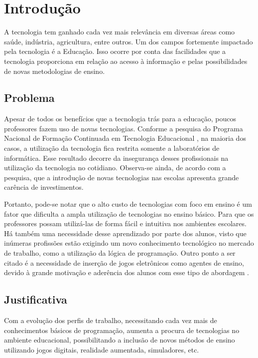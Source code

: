 
\chapter{Introdução}\label{intro}

A tecnologia tem ganhado cada vez mais relevância em diversas áreas como saúde, indústria, agricultura, entre outros. Um dos campos fortemente impactado pela tecnologia é a Educação. Isso ocorre por conta das facilidades que a tecnologia proporciona em relação ao acesso à informação e pelas possibilidades de novas metodologias de ensino. 


\section{Problema}

Apesar de todos os benefícios que a tecnologia trás para a educação, poucos professores fazem uso de novas tecnologias. Conforme a pesquisa do Programa Nacional de Formação Continuada em Tecnologia Educacional \cite{suenia_andre_2012} , na maioria dos casos, a utilização da tecnologia fica restrita somente a laboratórios de informática. Esse resultado decorre da insegurança desses profissionais na utilização da tecnologia no cotidiano. Observa-se ainda, de acordo com a pesquisa, que a introdução de novas tecnologias nas escolas apresenta grande carência de investimentos.

Portanto, pode-se notar que o alto custo de  tecnologias com foco em ensino é um fator que dificulta a ampla utilização de tecnologias no ensino básico. Para que os professores possam utilizá-las de forma fácil e intuitiva nos ambientes escolares. Há também uma necessidade desse aprendizado por parte dos alunos, visto que inúmeras profissões estão exigindo um novo conhecimento tecnológico no mercado de trabalho, como a utilização da lógica de programação. Outro ponto a ser citado é a necessidade de inserção de jogos eletrônicos como agentes de ensino, devido à grande motivação e aderência dos alunos com esse tipo de abordagem \cite{kaue_tatiane_marcos_2017}.


\section{Justificativa}

Com a evolução dos perfis de trabalho, necessitando cada vez mais de conhecimentos básicos de programação, aumenta a procura de tecnologias no ambiente educacional, possibilitando a inclusão de novos métodos de ensino utilizando jogos digitais, realidade aumentada, simuladores, etc.

